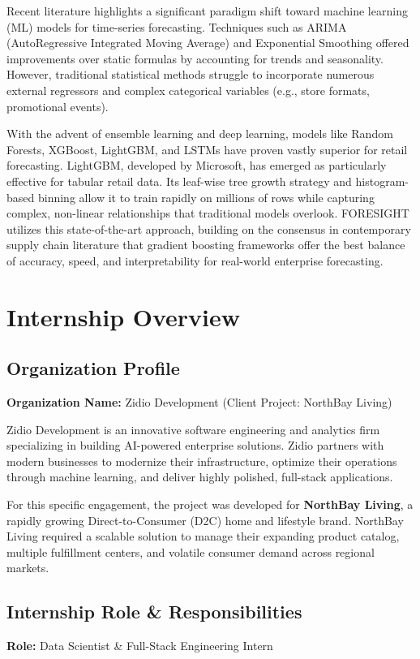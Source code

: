 \documentclass[12pt,a4paper]{report}
\begin{document}
Recent literature highlights a significant paradigm shift toward machine learning (ML) models for time-series forecasting. Techniques such as ARIMA (AutoRegressive Integrated Moving Average) and Exponential Smoothing offered improvements over static formulas by accounting for trends and seasonality. However, traditional statistical methods struggle to incorporate numerous external regressors and complex categorical variables (e.g., store formats, promotional events).

With the advent of ensemble learning and deep learning, models like Random Forests, XGBoost, LightGBM, and LSTMs have proven vastly superior for retail forecasting. LightGBM, developed by Microsoft, has emerged as particularly effective for tabular retail data. Its leaf-wise tree growth strategy and histogram-based binning allow it to train rapidly on millions of rows while capturing complex, non-linear relationships that traditional models overlook. FORESIGHT utilizes this state-of-the-art approach, building on the consensus in contemporary supply chain literature that gradient boosting frameworks offer the best balance of accuracy, speed, and interpretability for real-world enterprise forecasting.

\chapter{Internship Overview}

\section{Organization Profile}
\textbf{Organization Name:} Zidio Development (Client Project: NorthBay Living)

Zidio Development is an innovative software engineering and analytics firm specializing in building AI-powered enterprise solutions. Zidio partners with modern businesses to modernize their infrastructure, optimize their operations through machine learning, and deliver highly polished, full-stack applications. 

For this specific engagement, the project was developed for \textbf{NorthBay Living}, a rapidly growing Direct-to-Consumer (D2C) home and lifestyle brand. NorthBay Living required a scalable solution to manage their expanding product catalog, multiple fulfillment centers, and volatile consumer demand across regional markets.

\section{Internship Role \& Responsibilities}
\textbf{Role:} Data Scientist \& Full-Stack Engineering Intern
\end{document}

